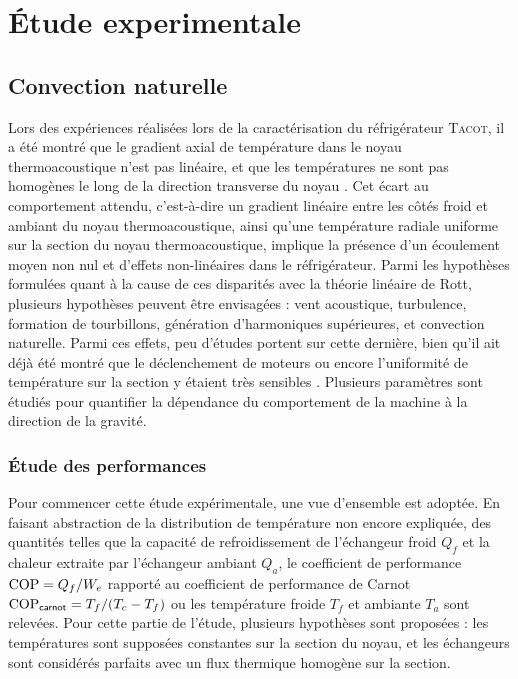 \chapter{\'Etude experimentale}\label{chap:EtudeExpe}
\mylocaltoc

\section{Convection naturelle}\label{chap:EtudeExpe_ConvNat}
Lors des expériences réalisées lors de la caractérisation du réfrigérateur \textsc{Tacot}, il a été montré que le gradient axial de température dans le noyau thermoacoustique n'est pas linéaire, et que les températures ne sont pas homogènes le long de la direction transverse du noyau \cite{ramadan_design_2021}. Cet écart au comportement attendu, c'est-à-dire un gradient linéaire entre les côtés froid et ambiant du noyau thermoacoustique, ainsi qu'une température radiale uniforme sur la section du noyau thermoacoustique, implique la présence d'un écoulement moyen non nul et d'effets non-linéaires dans le réfrigérateur. Parmi les hypothèses formulées quant à la cause de ces disparités avec la théorie linéaire de Rott, plusieurs hypothèses peuvent être envisagées : vent acoustique, turbulence, formation de tourbillons, génération d'harmoniques supérieures, et convection naturelle. Parmi ces effets, peu d'études portent sur cette dernière, bien qu'il ait déjà été montré que le déclenchement de moteurs ou encore l'uniformité de température sur la section y étaient très sensibles \cite{ross_influence_2003,  hireche_numerical_2019, ramadan_experimental_2018,  zhang_novel_2011}. Plusieurs paramètres sont étudiés pour quantifier la dépendance du comportement de la machine à la direction de la gravité. 

\subsection{\'Etude des performances}
Pour commencer cette étude expérimentale, une vue d'ensemble est adoptée. En faisant abstraction de la distribution de température non encore expliquée, des quantités telles que la capacité de refroidissement de l'échangeur froid $Q_f$ et la chaleur extraite par l'échangeur ambiant $Q_a$, le coefficient de performance $\mathrm{COP}=Q_f/W_e$ rapporté au coefficient de performance de Carnot $\mathrm{COP}_{\sf carnot} = T_f/(T_c-T_f)$ ou les température froide $T_f$ et ambiante $T_a$ sont relevées. Pour cette partie de l'étude, plusieurs hypothèses sont proposées : les températures sont supposées constantes sur la section du noyau, et les échangeurs sont considérés parfaits avec un flux thermique homogène sur la section. 

